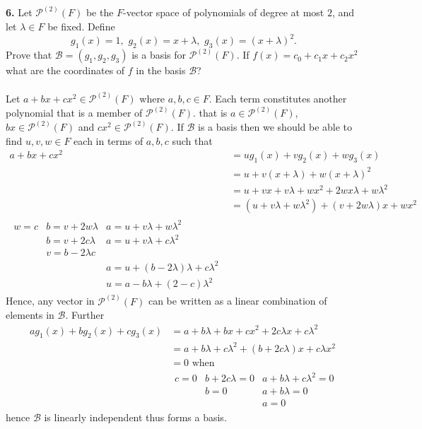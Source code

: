 \documentclass[11pt]{amsart}
\theoremstyle{definition}  %
\begin{document}
\newpage
\vskip 0.1cm
\noindent
{\bf 6.}  Let $\mathcal{P}^{(2)}(F)$ be the $F$-vector space of polynomials of degree at most $2$, and let $\lambda \in F$ be fixed. Define
$$ g_1(x) = 1,  \,\, g_2(x) = x + \lambda,  \,\, g_3(x) = (x+\lambda)^2.$$
Prove that $\mathcal{B} = (g_1, g_2, g_3)$ is a basis for $\mathcal{P}^{(2)}(F)$. If $f(x) = c_0 + c_1x + c_2x^2$ what are the coordinates of $f$
in the basis $\mathcal{B}$?  \\
\\
Let $a+bx+cx^2 \in \mathcal{P}^{(2)}(F)$ where $a,b,c \in F$.  Each term constitutes another polynomial that is a member of $\mathcal{P}^{(2)}(F)$.  that is $a \in \mathcal{P}^{(2)}(F)$, $bx \in \mathcal{P}^{(2)}(F)$ and $cx^2 \in \mathcal{P}^{(2)}(F)$.  If $\mathcal{B}$ is a basis then we should be able to find $u,v,w \in F$ each in terms of $a,b,c$ such that 
\begin{align*}
	a+bx+cx^2 &= ug_1(x)+vg_2(x)+wg_3(x) \\
	&= u+v(x+\lambda)+w(x+\lambda)^2 \\
	&= u+vx+v\lambda+wx^2+2wx\lambda+w\lambda^2 \\
	&= (u+v\lambda+w\lambda^2)+(v+2w\lambda) x +wx^2 \\
	\begin{array}{ccc}
		w=c & b=v+2w\lambda & a = u+v\lambda+w\lambda^2 \\
		    & b=v+2c\lambda & a = u+v\lambda+c\lambda^2 \\
		    & v = b-2\lambda c \\
		    &               & a = u+(b-2\lambda)\lambda + c\lambda^2 		    \\
		    && u = a-b\lambda+(2-c)\lambda^2
	\end{array}
\end{align*}Hence, any vector in $\mathcal{P}^{(2)}(F)$ can be written as a linear combination of elements in $\mathcal{B}$. Further
\begin{align*}
	ag_1(x)+bg_2(x)+cg_3(x) &= a+b\lambda + b x + cx^2+2c\lambda x + c\lambda^2 \\
	&= a+b\lambda+c\lambda^2 + (b+2c\lambda)x+c\lambda x^2\\
	&= 0 \text{ when} \\
	&\begin{array}{ccc}
		c=0 & b+2c\lambda=0 & a+b\lambda +c\lambda^2 = 0\\
		    & b=0 & a +b\lambda = 0\\
		    &     & a = 0
	\end{array}
\end{align*}hence $\mathcal{B}$ is linearly independent thus forms a basis.
\end{document}
